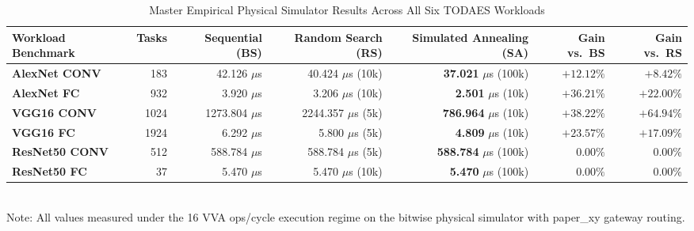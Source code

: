 \documentclass[10pt,conference]{IEEEtran}
\begin{document}
\begin{table}[t]
  \caption{Master Empirical Physical Simulator Results Across All Six TODAES Workloads}
  \label{tab:optimizer-comparison}
  \centering
  \small
  \begin{tabular}{lrrrrrr}
    \toprule
    Workload Benchmark & Tasks & Sequential (BS) & Random Search (RS) & Simulated Annealing (SA) & Gain vs.\ BS & Gain vs.\ RS \\
    \midrule
    \textbf{AlexNet CONV} & 183  & 42.126 $\mu$s   & 40.424 $\mu$s (10k) & \textbf{37.021} $\mu$s (100k) & $+12.12\%$ & $+8.42\%$ \\
    \textbf{AlexNet FC}   & 932  & 3.920 $\mu$s    & 3.206 $\mu$s (10k)  & \textbf{2.501} $\mu$s (10k)   & $+36.21\%$ & $+22.00\%$ \\
    \textbf{VGG16 CONV}   & 1024 & 1273.804 $\mu$s & 2244.357 $\mu$s (5k)& \textbf{786.964} $\mu$s (10k) & $+38.22\%$ & $+64.94\%$ \\
    \textbf{VGG16 FC}     & 1924 & 6.292 $\mu$s    & 5.800 $\mu$s (5k)   & \textbf{4.809} $\mu$s (10k)   & $+23.57\%$ & $+17.09\%$ \\
    \textbf{ResNet50 CONV}& 512  & 588.784 $\mu$s  & 588.784 $\mu$s (5k) & \textbf{588.784} $\mu$s (100k)& $0.00\%$   & $0.00\%$ \\
    \textbf{ResNet50 FC}  & 37   & 5.470 $\mu$s    & 5.470 $\mu$s (10k)  & \textbf{5.470} $\mu$s (100k)  & $0.00\%$   & $0.00\%$ \\
    \bottomrule
  \end{tabular}
  \vspace{0.5ex}
  \\ \footnotesize{Note: All values measured under the 16 VVA ops/cycle execution regime on the bitwise physical simulator with paper_xy gateway routing.}
\end{table}
\end{document}
